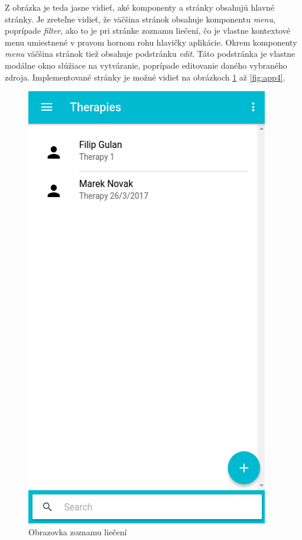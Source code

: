 Z obrázka je teda jasne vidieť, aké komponenty a stránky obsahujú hlavné stránky. Je zreteľne vidieť, že väčšina stránok obsahuje komponentu \textit{menu}, poprípade \textit{filter}, ako to je pri stránke zoznamu liečení, čo je vlastne kontextové menu umiestnené v pravom hornom rohu hlavičky aplikácie. Okrem komponenty \textit{menu} väčšina stránok tiež obsahuje podstránku \textit{edit}. Táto podstránka je vlastne modálne okno slúžiace na vytváranie, poprípade editovanie daného vybraného zdroja. Implementované stránky je možné vidieť na obrázkoch \ref{fig:app1} až \ref{fig:app4}.
 \begin{figure}[h]
   \begin{minipage}{0.48\textwidth}
     \centering
     \includegraphics[scale=0.60]{fig/app1.png}
      \caption{Obrazovka zoznamu liečení}
      \label{fig:app1}
   \end{minipage}\hfill

\end{figure}
